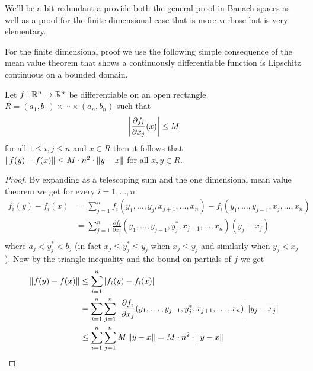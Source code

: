 We'll be a bit redundant a  provide both the general proof in Banach spaces as
well as a proof for the finite dimensional case that is more verbose
but is very elementary.

For the finite dimensional proof we use the following simple
consequence of the mean value theorem
that shows a continuously differentiable function is Lipschitz
continuous on a bounded domain.
\begin{lem}\label{IFT:BoundedDerivativeImpliesLipschitz}Let $f : \mathbb{R}^n \to \mathbb{R}^n$ be differentiable on an
  open rectangle $R = (a_1,b_1) \times \dotsm \times (a_n, b_n)$ such that 
\begin{align*}
\left \vert \frac{\partial f_i}{\partial x_j}(x) \right \vert \leq M
\end{align*}
for all $1 \leq i,j \leq n$ and $x \in R$ then it follows that
$\left \lVert f(y)-f(x) \right \rVert \leq M \cdot n^2 \cdot \left \lVert y-x \right \rVert$ for all $x,y \in R$.
\end{lem}
\begin{proof}
By expanding as a telescoping sum and the one
dimensional mean value theorem we
get for every $i=1, \dotsc, n$ 
\begin{align*}
f_i(y) - f_i(x) &= \sum_{j=1}^n f_i(y_1, \dotsc, y_j, x_{j+1},
                     \dotsc, x_n) - 
f_i(y_1, \dotsc, y_{j-1}, x_{j},
                     \dotsc, x_n)\\
&= \sum_{j=1}^n \frac{\partial f_i}{\partial x_j} (y_1, \dotsc, y_{j-1}, y^*_j, x_{j+1},
                     \dotsc, x_n) (y_j - x_j)\\
\end{align*}
where $a_j < y^*_j  < b_j$ (in fact $x_j \leq y^*_j \leq y_j$ when
$x_j \leq y_j$ and similarly when $y_j < x_j$).  Now by the triangle
inequality and the bound on partials of $f$ we get
\begin{align*}
\left \lVert f(y) - f(x) \right \rVert &\leq \sum_{i=1}^n \left \vert f_i(y) - f_i(x) \right \vert \\
&= \sum_{i=1}^n \sum_{j=1}^n \left \vert \frac{\partial f_i}{\partial x_j} (y_1, \dotsc, y_{j-1}, y^*_j, x_{j+1},
                     \dotsc, x_n) \right \vert \left \vert  y_j - x_j  \right \vert \\
&\leq \sum_{i=1}^n \sum_{j=1}^n M \left \lVert y - x \right \rVert = M \cdot n^2 \cdot
  \left \lVert y -x \right \rVert
\end{align*}
\end{proof}

